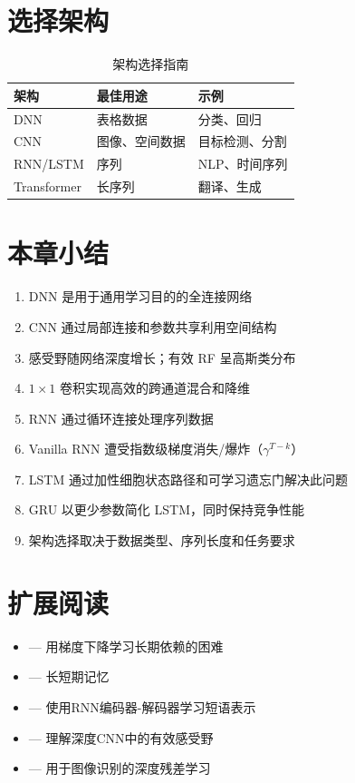 \section{选择架构}

\begin{table}[ht]
    \centering
    \caption{架构选择指南}
    \begin{tabular}{L{2.5cm} L{3.5cm} L{4cm}}
        \toprule
        \textbf{架构} & \textbf{最佳用途} & \textbf{示例} \\
        \midrule
        DNN & 表格数据 & 分类、回归 \\
        CNN & 图像、空间数据 & 目标检测、分割 \\
        RNN/LSTM & 序列 & NLP、时间序列 \\
        Transformer & 长序列 & 翻译、生成 \\
        \bottomrule
    \end{tabular}
\end{table}

\section{本章小结}

\begin{enumerate}
    \item DNN 是用于通用学习目的的全连接网络
    \item CNN 通过局部连接和参数共享利用空间结构
    \item 感受野随网络深度增长；有效 RF 呈高斯类分布
    \item $1 \times 1$ 卷积实现高效的跨通道混合和降维
    \item RNN 通过循环连接处理序列数据
    \item Vanilla RNN 遭受指数级梯度消失/爆炸（$\gamma^{T-k}$）
    \item LSTM 通过加性细胞状态路径和可学习遗忘门解决此问题
    \item GRU 以更少参数简化 LSTM，同时保持竞争性能
    \item 架构选择取决于数据类型、序列长度和任务要求
\end{enumerate}

\section{扩展阅读}

\begin{itemize}
    \item \cite{bengio1994learning} --- 用梯度下降学习长期依赖的困难
    \item \cite{hochreiter1997long} --- 长短期记忆
    \item \cite{cho2014properties} --- 使用RNN编码器-解码器学习短语表示
    \item \cite{luo2016understanding} --- 理解深度CNN中的有效感受野
    \item \cite{he2016deep} --- 用于图像识别的深度残差学习
\end{itemize}

